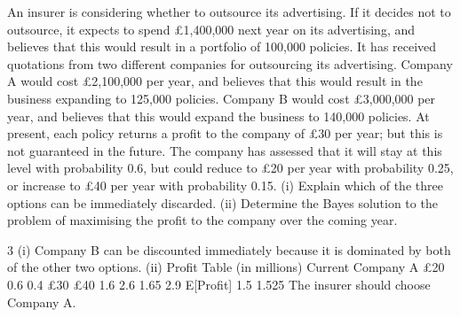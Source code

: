 \documentclass[a4paper,12pt]{article}
\begin{document}
An insurer is considering whether to outsource its advertising. If it decides not to
outsource, it expects to spend £1,400,000 next year on its advertising, and believes
that this would result in a portfolio of 100,000 policies. It has received quotations
from two different companies for outsourcing its advertising.
Company A would cost £2,100,000 per year, and believes that this would result in the
business expanding to 125,000 policies.
Company B would cost £3,000,000 per year, and believes that this would expand the
business to 140,000 policies.
At present, each policy returns a profit to the company of £30 per year; but this is not
guaranteed in the future. The company has assessed that it will stay at this level with
probability 0.6, but could reduce to £20 per year with probability 0.25, or increase to
£40 per year with probability 0.15.
(i) Explain which of the three options can be immediately discarded.
(ii) Determine the Bayes solution to the problem of maximising the profit to the
company over the coming year.

3
(i) Company B can be discounted immediately because it is dominated by both of
the other two options.
(ii) Profit Table (in millions)
Current
Company A
£20
0.6
0.4
£30
£40
1.6
2.6
1.65 2.9
E[Profit]
1.5
1.525
The insurer should choose Company A.
\end{document}
